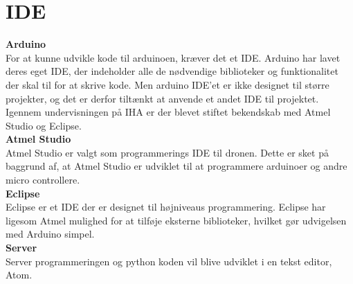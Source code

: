 \section{IDE}

\textbf{Arduino} \\
For at kunne udvikle kode til arduinoen, kræver det et IDE. Arduino har lavet deres eget IDE, der indeholder alle de nødvendige biblioteker og funktionalitet der skal til for at skrive kode. Men arduino IDE'et er ikke designet til større projekter, og det er derfor tiltænkt at anvende et andet IDE til projektet. 
Igennem undervisningen på IHA er der blevet stiftet bekendskab med Atmel Studio og Eclipse. \\

\textbf{Atmel Studio} \\
Atmel Studio er valgt som programmerings IDE til dronen. Dette er sket på baggrund af, at Atmel Studio er udviklet til at programmere arduinoer og andre micro controllere. \\

\textbf{Eclipse} \\
Eclipse er et IDE der er designet til højniveaus programmering. Eclipse har ligesom Atmel mulighed for at tilføje eksterne biblioteker, hvilket gør udvigelsen med Arduino simpel. \\

\textbf{Server} \\
Server programmeringen og python koden vil blive udviklet i en tekst editor, Atom.  